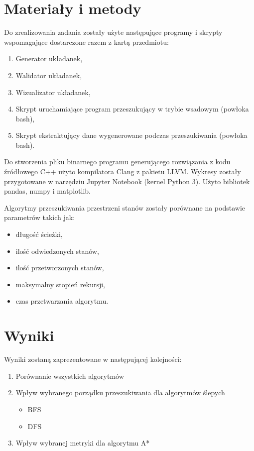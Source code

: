 \documentclass{classrep}
\begin{document}
\section{Materiały i metody}
Do zrealizowania zadania zostały użyte następujące programy i skrypty wspomagające dostarczone razem z kartą
przedmiotu:
\begin{enumerate}
  \item Generator układanek,
  \item Walidator układanek,
  \item Wizualizator układanek,
  \item Skrypt uruchamiające program przeszukujący w trybie wsadowym (powłoka bash),
  \item Skrypt ekstraktujący dane wygenerowane podczas przeszukiwania (powłoka bash).
\end{enumerate}
Do stworzenia pliku binarnego programu generującego rozwiązania z kodu źródłowego C++ użyto kompilatora
Clang z pakietu LLVM. Wykresy zostały przygotowane w narzędziu Jupyter Notebook (kernel Python 3).
Użyto bibliotek pandas, numpy i matplotlib.

Algorytmy przeszukiwania przestrzeni stanów zostały porównane na podstawie parametrów takich jak:
\begin{itemize}
  \item długość ścieżki,
  \item ilość odwiedzonych stanów,
  \item ilość przetworzonych stanów,
  \item maksymalny stopień rekursji,
  \item czas przetwarzania algorytmu.
\end{itemize}

\section{Wyniki}

Wyniki zostaną zaprezentowane w następującej kolejności:
\begin{enumerate}
  \item Porównanie wszystkich algorytmów
  \item Wpływ wybranego porządku przeszukiwania dla algorytmów ślepych
    \begin{itemize}
      \item BFS
      \item DFS
    \end{itemize}
  \item Wpływ wybranej metryki dla algorytmu A*
\end{enumerate}
\end{document}
